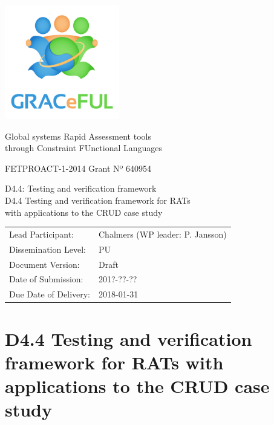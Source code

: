 \documentclass{article}
\author{}
\date{}
\begin{document}
\begin{center}
\includegraphics[width=5cm]{../coverpage/GRACeFULlogo.png}

\textcolor{GRACeFULblue}{Global systems Rapid Assessment tools\\
through Constraint FUnctional Languages}

\vspace{1cm}

FETPROACT-1-2014 Grant Nº 640954

\end{center}

\begin{framed}
\begin{center}
\Large
D4.4: Testing and verification framework\\[1ex]

\large
D4.4 Testing and verification framework for RATs\\
with applications to the CRUD case study\\[1ex]

\end{center}
\end{framed}

\vspace{1cm}

\noindent
\begin{tabular}{@{}ll@{}}
  Lead Participant:       & Chalmers (WP leader: P. Jansson)
\\Dissemination Level:    & PU
\\Document Version:       & Draft
\\Date of Submission:     & 201?-??-??
\\Due Date of Delivery:   & 2018-01-31
\end{tabular}

\newpage

\section*{D4.4 Testing and verification framework for RATs with
  applications to the CRUD case study}
\end{document}
